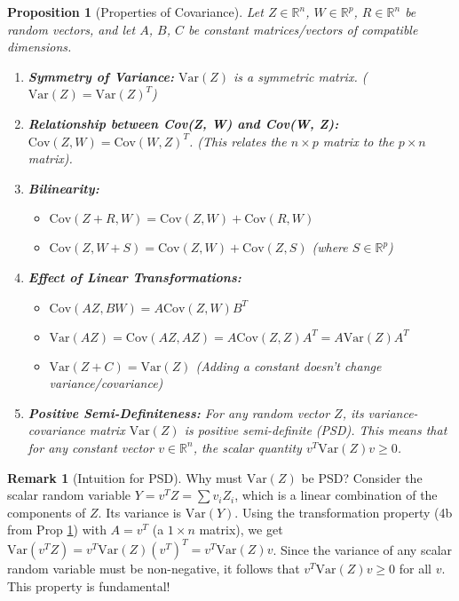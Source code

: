 \documentclass[11pt]{article}
\newtheorem{proposition}[theorem]{Proposition}
\theoremstyle{definition}
\newtheorem{remark}[theorem]{Remark}
\newcommand{\R}{\mathbb{R}} %
\newcommand{\Var}{\mathrm{Var}} %
\newcommand{\Cov}{\mathrm{Cov}} %
\newcommand{\T}{^T} %
\begin{document}
\begin{proposition}[Properties of Covariance]
\label{prop:cov_properties}
Let $Z \in \R^n$, $W \in \R^p$, $R \in \R^n$ be random vectors, and let $A$, $B$, $C$ be constant matrices/vectors of compatible dimensions.
\begin{enumerate}
    \item \textbf{Symmetry of Variance:} $\Var(Z)$ is a symmetric matrix. ($\Var(Z) = \Var(Z)\T$)
    \item \textbf{Relationship between Cov(Z, W) and Cov(W, Z):} $\Cov(Z, W) = \Cov(W, Z)\T$. (This relates the $n \times p$ matrix to the $p \times n$ matrix).
    \item \textbf{Bilinearity:}
        \begin{itemize}
            \item $\Cov(Z + R, W) = \Cov(Z, W) + \Cov(R, W)$
            \item $\Cov(Z, W + S) = \Cov(Z, W) + \Cov(Z, S)$ (where $S \in \R^p$)
        \end{itemize}
    \item \textbf{Effect of Linear Transformations:}
        \begin{itemize}
            \item $\Cov(AZ, BW) = A \Cov(Z, W) B\T$
            \item $\Var(AZ) = \Cov(AZ, AZ) = A \Cov(Z, Z) A\T = A \Var(Z) A\T$
            \item $\Var(Z + C) = \Var(Z)$ (Adding a constant doesn't change variance/covariance)
        \end{itemize}
    \item \textbf{Positive Semi-Definiteness:} For any random vector $Z$, its variance-covariance matrix $\Var(Z)$ is positive semi-definite (PSD). This means that for any constant vector $v \in \R^n$, the scalar quantity $v\T \Var(Z) v \ge 0$.
\end{enumerate}
\end{proposition}

\begin{remark}[Intuition for PSD]
\label{rem:psd_intuition}
Why must $\Var(Z)$ be PSD? Consider the scalar random variable $Y = v\T Z = \sum v_i Z_i$, which is a linear combination of the components of $Z$. Its variance is $\Var(Y)$. Using the transformation property (4b from Prop \ref{prop:cov_properties}) with $A = v\T$ (a $1 \times n$ matrix), we get $\Var(v\T Z) = v\T \Var(Z) (v\T)\T = v\T \Var(Z) v$. Since the variance of any scalar random variable must be non-negative, it follows that $v\T \Var(Z) v \ge 0$ for all $v$. This property is fundamental!
\end{remark}
\end{document}

